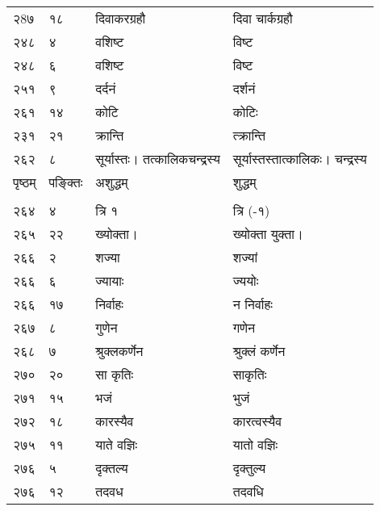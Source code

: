 \documentclass[11pt, openany]{book}
\begin{document}
\begin{longtable}{p{1cm} p{1.5cm} p{4.5cm} p{4.5cm}}
 २8७ & १८ & दिवाकरग्रहौ & दिवा चार्कग्रहौ\\ 

 २४८ & ४ & वशिष्ट & विष्ट \\

 २४८ & ६ & वशिष्ट &  विष्ट \\

 २५१ & ९ & दर्दनं & दर्शनं \\

 २६१ & १४ & कोटि & कोटिः \\

 २३१ & २१ & क्रान्ति & त्क्रान्ति \\

 २६२ & ८ & सूर्यास्तः। तत्कालिकचन्द्रस्य & सूर्यास्तस्तात्कालिकः। चन्द्रस्य \\



\newpage



पृष्ठम् & पङ्क्तिः & अशुद्धम् & शुद्धम्\\
\vspace{2mm}\\

 २६४ & ४ & त्रि १ & त्रि (-१)\\

 २६५ & २२ & ख्योक्ता। & ख्योक्ता युक्ता।\\

 २६६ & २ & शज्या & शज्यां\\

 २६६ & ६ & ज्यायाः & ज्ययोः\\

 २६६ & १७ & निर्वाहः & न निर्वाहः \\

 २६७ & ८ & गुणेन & गणेन \\

 २६८ & ७ & श्रुक्लकर्णेन  & श्रुक्लं कर्णेन \\

 २७० & २० & सा कृतिः & साकृतिः \\

 २७१ & १५ & भजं & भुजं \\

 २७२ & १८ & कारस्यैव & कारत्वस्यैव \\

 २७५ & ११ & याते वज्ञिः & यातो वज्ञिः \\

 २७६ & ५ & दृक्तल्य & दृक्तुल्य \\

 २७६ & १२ & तदवध & तदवधि \\


\end{longtable}
\end{document}
